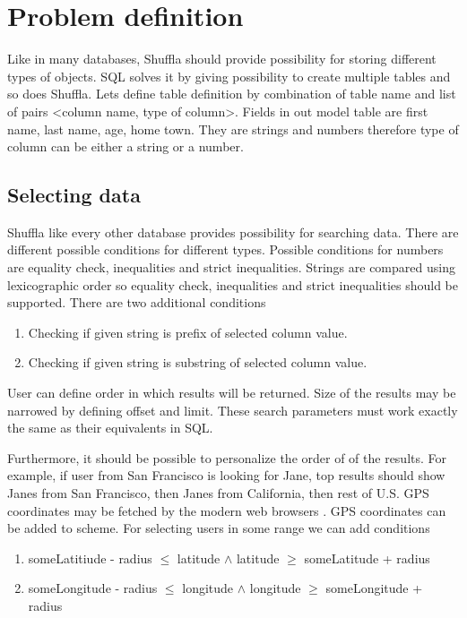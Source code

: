 \documentclass[10pt,a4paper]{article}
\begin{document}

\section{Problem definition}

Like in many databases, Shuffla should provide possibility for storing different types of objects. SQL solves it by giving possibility to create multiple tables and so does Shuffla. Lets define table definition by combination of table name and list of pairs <column name, type of column>. Fields in out model table are first name, last name, age, home town. They are strings and numbers therefore type of column can be either a string or a number.

\subsection{Selecting data}
Shuffla like every other database provides possibility for searching data. There are different possible conditions for different types. Possible conditions for numbers are equality check, inequalities and strict inequalities. Strings are compared using lexicographic order so equality check, inequalities and strict inequalities should be supported. There are two additional conditions
\begin{enumerate}
\item Checking if given string is prefix of selected column value.
\item Checking if given string is substring of selected column value. 
\end{enumerate}

User can define order in which results will be returned. Size of the results may be narrowed by defining offset and limit. These search parameters must work exactly the same as their equivalents in SQL.

Furthermore, it should be possible to personalize the order of of the results. For example, if user from San Francisco is looking for Jane, top results should show Janes from San Francisco, then Janes from California, then rest of U.S. GPS coordinates may be fetched by the modern web browsers \cite{FETCHGPS}. GPS coordinates can be added to scheme. For selecting users in some range we can add conditions   
\begin{enumerate}
\item{someLatitiude - radius $\leq$ latitude $\wedge$ latitude $\geq$ someLatitude + radius}
\item{someLongitude - radius $\leq$ longitude $\wedge$ longitude $\geq$ someLongitude + radius}
\end{enumerate}
\end{document}
